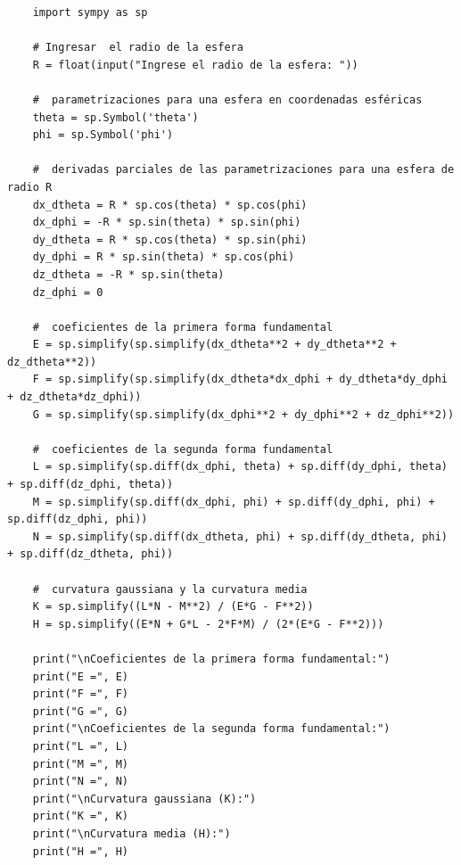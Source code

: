\documentclass{article}
\begin{document}
\begin{verbatim}
	import sympy as sp
	
	# Ingresar  el radio de la esfera
	R = float(input("Ingrese el radio de la esfera: "))
	
	#  parametrizaciones para una esfera en coordenadas esféricas
	theta = sp.Symbol('theta')
	phi = sp.Symbol('phi')
	
	#  derivadas parciales de las parametrizaciones para una esfera de radio R
	dx_dtheta = R * sp.cos(theta) * sp.cos(phi)
	dx_dphi = -R * sp.sin(theta) * sp.sin(phi)
	dy_dtheta = R * sp.cos(theta) * sp.sin(phi)
	dy_dphi = R * sp.sin(theta) * sp.cos(phi)
	dz_dtheta = -R * sp.sin(theta)
	dz_dphi = 0
	
	#  coeficientes de la primera forma fundamental
	E = sp.simplify(sp.simplify(dx_dtheta**2 + dy_dtheta**2 + dz_dtheta**2))
	F = sp.simplify(sp.simplify(dx_dtheta*dx_dphi + dy_dtheta*dy_dphi + dz_dtheta*dz_dphi))
	G = sp.simplify(sp.simplify(dx_dphi**2 + dy_dphi**2 + dz_dphi**2))
	
	#  coeficientes de la segunda forma fundamental
	L = sp.simplify(sp.diff(dx_dphi, theta) + sp.diff(dy_dphi, theta) + sp.diff(dz_dphi, theta))
	M = sp.simplify(sp.diff(dx_dphi, phi) + sp.diff(dy_dphi, phi) + sp.diff(dz_dphi, phi))
	N = sp.simplify(sp.diff(dx_dtheta, phi) + sp.diff(dy_dtheta, phi) + sp.diff(dz_dtheta, phi))
	
	#  curvatura gaussiana y la curvatura media
	K = sp.simplify((L*N - M**2) / (E*G - F**2))
	H = sp.simplify((E*N + G*L - 2*F*M) / (2*(E*G - F**2)))
	
	print("\nCoeficientes de la primera forma fundamental:")
	print("E =", E)
	print("F =", F)
	print("G =", G)
	print("\nCoeficientes de la segunda forma fundamental:")
	print("L =", L)
	print("M =", M)
	print("N =", N)
	print("\nCurvatura gaussiana (K):")
	print("K =", K)
	print("\nCurvatura media (H):")
	print("H =", H)
\end{verbatim}
	
	
	
	
	
\end{document}
